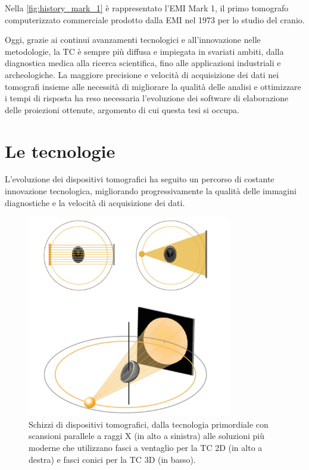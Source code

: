 \documentclass[12pt,a4paper]{report}
\begin{document}
Nella \autoref{fig:history_mark_1} è rappresentato l'EMI Mark 1, il primo tomografo computerizzato commerciale prodotto dalla EMI
nel 1973 per lo studio del cranio.

Oggi, grazie ai continui avanzamenti tecnologici e all'innovazione nelle metodologie, la TC è sempre più diffusa e impiegata in
svariati ambiti, dalla diagnostica medica alla ricerca scientifica, fino alle applicazioni industriali e archeologiche.
La maggiore precisione e velocità di acquisizione dei dati nei tomografi insieme alle necessità di migliorare la qualità delle
analisi e ottimizzare i tempi di risposta ha reso necessaria l'evoluzione dei software di elaborazione delle proiezioni ottenute,
argomento di cui questa tesi si occupa.

\section{Le tecnologie}

L'evoluzione dei dispositivi tomografici ha seguito un percorso di costante innovazione tecnologica, migliorando progressivamente
la qualità delle immagini diagnostiche e la velocità di acquisizione dei dati.

\begin{figure}[H]
  \centering
  \includegraphics[width=0.8\textwidth]{tecniche-di-scansione}
  \caption{\label{fig:history_tecnologies} Schizzi di dispositivi tomografici, dalla tecnologia primordiale
           con scansioni parallele a raggi X (in alto a sinistra) alle soluzioni più moderne che utilizzano fasci a ventaglio per
           la TC 2D (in alto a destra) e fasci conici per la TC 3D (in basso). \cite{MoroLoli2021}}
\end{figure}
\end{document}
